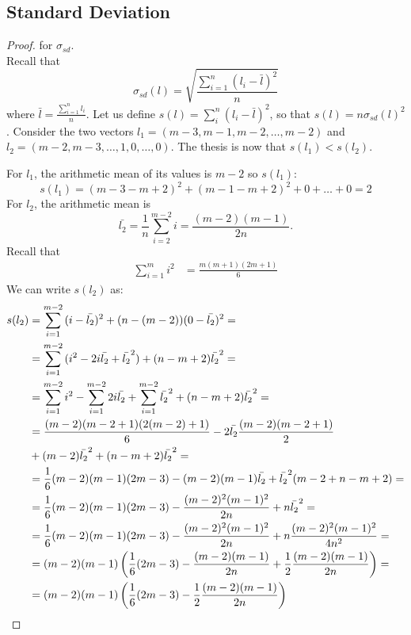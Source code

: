 \subsection{Standard Deviation}
\begin{proof} for $\sigma_{sd}$. \\
	Recall that 
	\[\sigma_{sd}(l)= \sqrt{\frac{\sum_{i=1}^{n}(l_i-\bar{l})^2}{n}}\]	
	where $\bar{l}=\frac{\sum_{i=1}^{n}l_i}{n}$.
	Let us define $s(l)= \sum_{i}^{n}(l_i-\bar{l})^2$, so that $s(l) = n \sigma_{sd}(l)^2$.
	Consider the two vectors $l_1=(m-3, m-1, m-2, \dots, m-2)$ and $l_2=(m-2, m-3, \dots, 1, 0, \dots, 0)$. The thesis is now that $s(l_1) < s(l_2)$.
	
	For $l_1$, the arithmetic mean of its values is $m-2$ so $s(l_1)$: 
	\[s(l_1)=(m-3-m+2)^2+(m-1-m+2)^2+ 0 + \dots + 0= 2\]
	For $l_2$, the arithmetic mean is 
	\[\bar{l_2}=\frac{1}{n}\sum_{i=2}^{m-2}{i}= \frac{(m-2)(m-1)}{2n}.\]
	Recall that 
	\begin{align*}
		\sum_{i=1}^{m}{i^2} &= \frac{m(m+1)(2m+1)}{6}
	\end{align*}
	We can write $s(l_2)$ as:
	\begin{align*}
		s(l_2)&= \sum_{i=1}^{m-2}{(i-\bar{l_2})^2}+(n-(m-2))(0-\bar{l_2})^2=\\
		&= \sum_{i=1}^{m-2}{(i^2-2i\bar{l_2}+\bar{l_2}^2)}+(n-m+2)\bar{l_2}^2=\\
		&= \sum_{i=1}^{m-2}{i^2}-\sum_{i=1}^{m-2}{2i\bar{l_2}}+ \sum_{i=1}^{m-2}{\bar{l_2}^2}+(n-m+2)\bar{l_2}^2=\\
		&=\frac{(m-2)(m-2+1)(2(m-2)+1)}{6}-2\bar{l_2}\frac{(m-2)(m-2+1)}{2} \\
		& +(m-2)\bar{l_2}^2 +(n-m+2)\bar{l_2}^2= \\
		&=\frac{1}{6}(m-2)(m-1)(2m-3)-(m-2)(m-1)\bar{l_2}+\bar{l_2}^2(m-2+n-m+2)=\\
		&=\frac{1}{6}(m-2)(m-1)(2m-3)-\frac{(m-2)^2(m-1)^2}{2n}+n\bar{l_2}^2=\\
		&=\frac{1}{6}(m-2)(m-1)(2m-3)-\frac{(m-2)^2(m-1)^2}{2n}+n\frac{(m-2)^2(m-1)^2}{4n^2}=\\
		&=(m-2)(m-1)\left(\frac{1}{6}(2m-3)-\frac{(m-2)(m-1)}{2n}+\frac{1}{2}\frac{(m-2)(m-1)}{2n}\right)=\\
		&=(m-2)(m-1)\left(\frac{1}{6}(2m-3)-\frac{1}{2}\frac{(m-2)(m-1)}{2n}\right)
	\end{align*} 
	

\end{proof}
